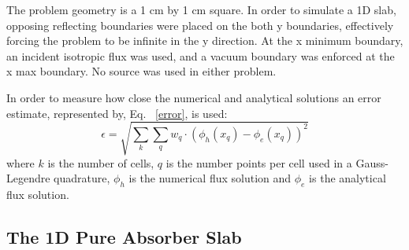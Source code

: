The problem geometry is a 1 cm by 1 cm square. In order to simulate a 1D slab, opposing reflecting boundaries were placed on the both y boundaries, effectively forcing the problem to be infinite in the y direction. At the x minimum boundary, an incident isotropic flux was used, and a vacuum boundary was enforced at the x max boundary. No source was used in either problem.

In order to measure how close the numerical and analytical solutions an error estimate, represented by, Eq. ~\eqref{error}, is used:
\begin{equation}
\epsilon = \sqrt{\sum_k \sum_q w_q \cdot(\phi_h(x_q) - \phi_e(x_q))^2}
\label{error}
\end{equation}
where $k$ is the number of cells, $q$ is the number points per cell used in a Gauss-Legendre quadrature, $\phi_h$ is the numerical flux solution and $\phi_e$ is the analytical flux solution.

\subsection{The 1D Pure Absorber Slab}

